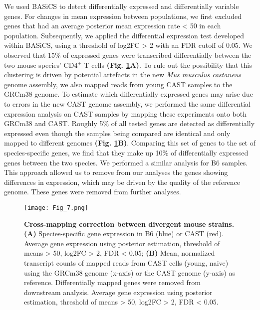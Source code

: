 We used BASiCS to detect differentially expressed and differentially variable genes. For changes in mean expression between populations, we first excluded genes that had an average posterior mean expression rate < 50 in each population. Subsequently, we applied the differential expression test developed within BASiCS, using a threshold of log2FC > 2 with an FDR cutoff of 0.05. We observed that 15\% of expressed genes were transcribed differentially between the two mouse species’ CD4$^+$ T cells \textbf{(Fig. \ref{fig1:spec_spec_mapping}A)}. To rule out the possibility that this clustering is driven by potential artefacts in the new \textit{Mus musculus castaneus} genome assembly, we also mapped reads from young CAST samples to the GRCm38 genome. To estimate which differentially expressed genes may arise due to errors in the new CAST genome assembly, we performed the same differential expression analysis on CAST samples by mapping these experiments onto both GRCm38 and CAST. Roughly 5\% of all tested genes are detected as differentially expressed even though the samples being compared are identical and only mapped to different genomes \textbf{(Fig. \ref{fig1:spec_spec_mapping}B)}. Comparing this set of genes to the set of species-specific genes, we find that they make up 10\% of differentially expressed genes between the two species. We performed a similar analysis for B6 samples. This approach allowed us to remove from our analyses the genes showing differences in expression, which may be driven by the quality of the reference genome. These genes were removed from further analyses.

\begin{figure}[!hb]
\centering
\texttt{[image: Fig\_7.png]}
\caption[Cross-mapping correction between divergent mouse strains]{\textbf{Cross-mapping correction between divergent mouse strains.}\\
\textbf{(A)} Species-specific gene expression in B6 (blue) or CAST (red). Average gene expression using posterior estimation, threshold of means > 50, log2FC > 2, FDR < 0.05; \textbf{(B)} Mean, normalized transcript counts of mapped reads from CAST cells (young, naive) using the GRCm38 genome (x-axis) or the CAST genome (y-axis) as reference. Differentially mapped genes were removed from downstream analysis. Average gene expression using posterior estimation, threshold of means > 50, log2FC > 2, FDR < 0.05.
}
\label{fig1:spec_spec_mapping}
\end{figure}

